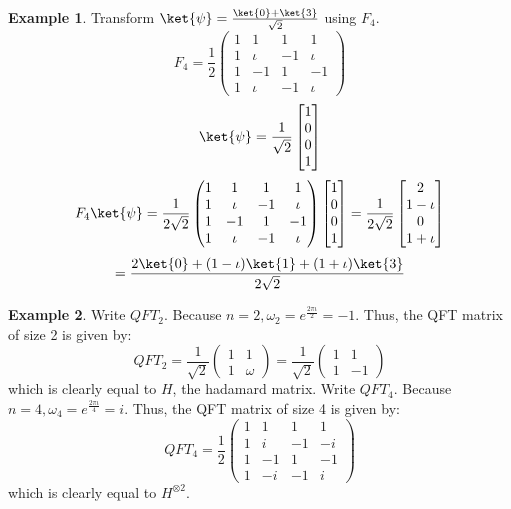 \documentclass[12pt, oneside]{book}
\theoremstyle{definition}
\theoremstyle{definition}
\newtheorem{example}{Example}[section]
\theoremstyle{remark}
\begin{document}
\begin{example}
    Transform $\ket{\psi}=\frac{\ket{0}+\ket{3}}{\sqrt{2}}$ using $F_4$.
    \[ F_4=\dfrac{1}{2}\begin{pmatrix} 1 & 1 & 1 & 1 \\ 1 & \iota & -1 & \iota \\ 1 & -1 & 1 & -1 \\ 1 & \iota & -1 &\iota \end{pmatrix} \]
    \[ \ket{\psi}=\frac{1}{\sqrt{2}}\begin{bmatrix} 1 \\0 \\ 0 \\ 1 \end{bmatrix} \]
    \[ F_4\ket{\psi}=\dfrac{1}{2\sqrt{2}}\begin{pmatrix} 1 & 1 & 1 & 1 \\ 1 &\iota & -1 & \iota \\ 1 & -1 & 1 & -1 \\ 1 & \iota & -1 &\iota \end{pmatrix}\begin{bmatrix} 1 \\0 \\ 0 \\ 1 \end{bmatrix}=\dfrac{1}{2\sqrt{2}}\begin{bmatrix} 2 \\ 1-\iota  \\ 0 \\ 1+\iota \end{bmatrix} \]
    \[ =\dfrac{2\ket{0}+(1-\iota)\ket{1}+(1+\iota)\ket{3}}{2\sqrt{2}}\]
\end{example}

\begin{example}
    Write $QFT_2$.
    Because $n=2, \omega_2=e^{\frac{2\pi\iota}{2}}=-1$. Thus, the QFT matrix of size 2 is given by:
    \[ QFT_2=\dfrac{1}{\sqrt{2}}\begin{pmatrix} 1 & 1  \\ 1 & \omega \end{pmatrix}=\frac{1}{\sqrt{2}}\begin{pmatrix} 1 & 1 \\ 1 & -1 \end{pmatrix} \]
    which is clearly equal to $H$, the hadamard matrix.
    Write $QFT_4$.
    Because $n=4, \omega_4=e^{\frac{2\pi\iota}{4}}=i$. Thus, the QFT matrix of size 4 is given by:
    \[ QFT_4=\dfrac{1}{2}\begin{pmatrix} 1 & 1 & 1 & 1 \\ 1 & i & -1 & -i \\ 1 & -1 & 1 & -1 \\ 1 & -i & -1 & i \end{pmatrix} \]
    which is clearly equal to $H^{\otimes 2}$.
\end{example}
\end{document}
